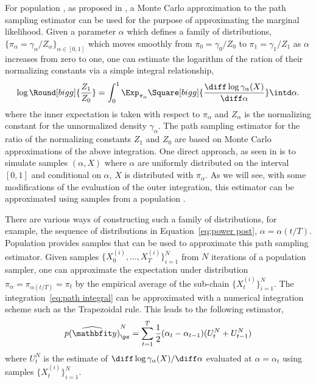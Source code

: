 For population \mcmc, as proposed in \cite{Calderhead:2009bd}, a Monte Carlo approximation to the path sampling estimator \cite{Gelman:1998ei} can be used for the purpose of approximating the marginal likelihood. Given a parameter $\alpha$ which defines a family of distributions, $\{\pi_{\alpha} = \gamma_{\alpha}/Z_{\alpha}\}_{\alpha\in[0,1]}$ which moves smoothly from $\pi_0 = \gamma_0/Z_0$ to $\pi_1 = \gamma_1/Z_1$ as $\alpha$ increases from zero to one, one can estimate the logarithm of the ration of their normalizing constants via a simple integral relationship,
\begin{equation}
  \log\Round[bigg]{\frac{Z_1}{Z_0}} = \int_0^1\Exp_{\pi_{\alpha}}
  \Square[bigg]{\frac{\diff\log\gamma_{\alpha}(X)}{\diff\alpha}}
  \intd\alpha.
  \label{eq:path integral}
\end{equation}
where the inner expectation is taken with respect to $\pi_{\alpha}$ and $Z_{\alpha}$ is the normalizing constant for the unnormalized density $\gamma_{\alpha}$. The path sampling estimator for the ratio of the normalizing constants $Z_1$ and $Z_0$ are based on Monte Carlo approximations of the above integration. One direct approach, as seen in \cite{Gelman:1998ei} is to simulate samples $(\alpha,X)$ where $\alpha$ are uniformly distributed on the interval $[0,1]$ and conditional on $\alpha$, $X$ is distributed with $\pi_{\alpha}$. As we will see, with some modifications of the evaluation of the outer integration, this estimator can be approximated using samples from a population \mcmc.

There are various ways of constructing such a family of distributions, for example, the sequence of distributions in Equation~\eqref{eq:power post}, $\alpha = \alpha(t/T)$. Population \mcmc provides samples that can be used to approximate this path sampling estimator. Given samples $\{X_0^{(i)},\dots,X_T^{(i)}\}_{i=1}^N$ from $N$ iterations of a population \mcmc sampler, one can approximate the expectation under distribution $\pi_{\alpha} = \pi_{\alpha(t/T)} = \pi_t$ by the empirical average of the sub-chain $\{X_t^{(i)}\}_{i=1}^N$. The integration~\eqref{eq:path integral} can be approximated with a numerical integration scheme such as the Trapezoidal rule. This leads to the following estimator,
\begin{equation}
  \widehat{p(\data)}_{\ps}^N = \sum_{t=1}^T
  \frac{1}{2}(\alpha_t - \alpha_{t-1})(U_t^N + U_{t-1}^N)
\end{equation}
where $U_t^N$ is the estimate of $\diff\log\gamma_{\alpha}(X)/\diff\alpha$ evaluated at $\alpha = \alpha_t$ using samples $\{X_t^{(i)}\}_{i=1}^N$.

